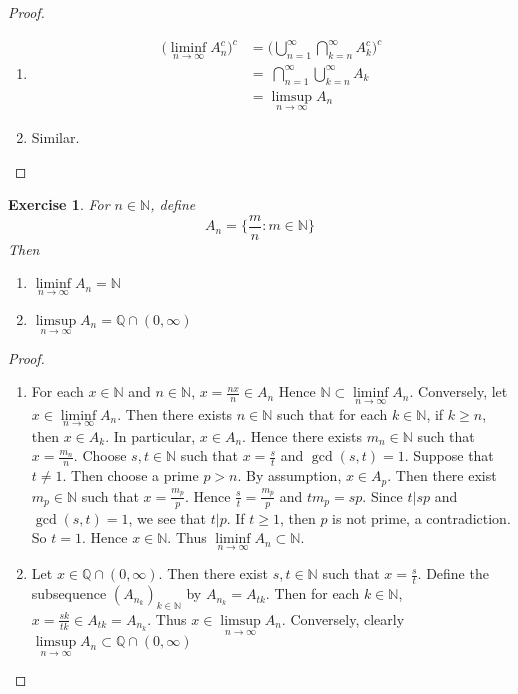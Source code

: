 \documentclass[12pt]{amsart}
\newtheorem{ex}[thm]{Exercise}
\newcommand{\N}{\mathbb{N}}
\newcommand{\Q}{\mathbb{Q}}
\begin{document}
\begin{proof}\
\begin{enumerate}
\item \begin{align*}
\bigg( \liminf\limits_{n \rightarrow \infty}A_n^c \bigg)^c 
&= \bigg( \bigcup\limits_{n=1}^{\infty} \bigcap\limits_{k=n}^{\infty}A_k^c \bigg)^c\\
&= \ \bigcap\limits_{n=1}^{\infty}\bigcup\limits_{k=n}^{\infty}A_k  \\
&=  \limsup\limits_{n \rightarrow \infty}A_n
\end{align*}
\item Similar.
\end{enumerate}
\end{proof}\newpage

\begin{ex}
For $n \in \N$, define $$A_n = \bigg\{ \frac{m}{n}: m \in \N \bigg\}$$ 
Then
\begin{enumerate}
\item $\liminf\limits_{n \rightarrow \infty }A_n = \N$ 
\item $\limsup\limits_{n \rightarrow \infty }A_n = \Q \cap (0,\infty )$
\end{enumerate}
\end{ex}

\begin{proof}\
\begin{enumerate}
\item For each $x \in \N$ and $n \in \N$, $x = \frac{nx}{n} \in A_n$ Hence $\N \subset \liminf\limits_{n \rightarrow \infty }A_n$. Conversely, let $x \in \liminf\limits_{n \rightarrow \infty }A_n$. Then there exists $n \in \N$ such that for each $k \in \N$, if $k \geq n$, then $x \in A_k$. In particular, $x \in A_n$. Hence there exists $m_n \in \N$ such that $x = \frac{m_n}{n}$. Choose $s,t \in \N$ such that $x= \frac{s}{t}$ and $\gcd(s,t) = 1$. Suppose that $t \neq 1$. Then choose a prime $p > n$. By assumption, $x \in A_p$. Then there exist $m_p \in \N$ such that $x = \frac{m_p}{p}$. Hence $\frac{s}{t} = \frac{m_p}{p}$ and $tm_p = sp$. Since $t \vert sp$ and $\gcd(s,t) = 1$, we see that $t \vert p$. If $t \geq 1$, then $p$ is not prime, a contradiction. So $t = 1$. Hence $x \in \N$. Thus $\liminf\limits_{n \rightarrow \infty }A_n \subset \N$. 
\item Let $x \in \Q \cap (0, \infty)$. Then there exist $s,t \in \N$ such that $x = \frac{s}{t}$. Define the subsequence $(A_{n_k})_{k \in \N}$ by $A_{n_k} = A_{tk}$. Then for each $k \in \N$, $x = \frac{sk}{tk} \in A_{tk} = A_{n_k}$. Thus $x \in \limsup\limits_{n \rightarrow \infty }A_n$. Conversely, clearly $\limsup\limits_{n \rightarrow \infty }A_n \subset \Q \cap (0, \infty)$ 
\end{enumerate}
\end{proof}
\end{document}

